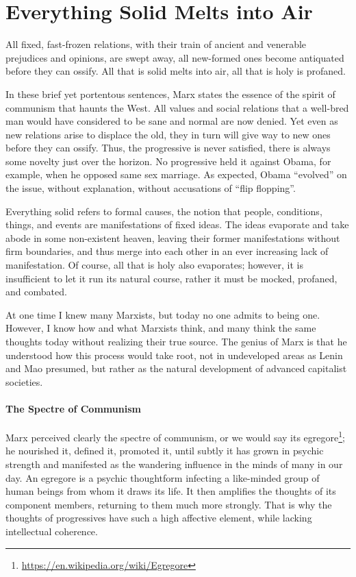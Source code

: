 \section{Everything Solid Melts into Air}

\begin{quotex}
All fixed, fast-frozen relations, with their train of ancient and venerable prejudices and opinions, are swept away, all new-formed ones become antiquated before they can ossify. All that is solid melts into air, all that is holy is profaned.
\end{quotex}


In these brief yet portentous sentences, Marx states the essence of the spirit of communism that haunts the West. All values and social relations that a well-bred man would have considered to be sane and normal are now denied. Yet even as new relations arise to displace the old, they in turn will give way to new ones before they can ossify. Thus, the progressive is never satisfied, there is always some novelty just over the horizon. No progressive held it against Obama, for example, when he opposed same sex marriage. As expected, Obama ``evolved'' on the issue, without explanation, without accusations of ``flip flopping''.

Everything solid refers to formal causes, the notion that people, conditions, things, and events are manifestations of fixed ideas. The ideas evaporate and take abode in some non-existent heaven, leaving their former manifestations without firm boundaries, and thus merge into each other in an ever increasing lack of manifestation. Of course, all that is holy also evaporates; however, it is insufficient to let it run its natural course, rather it must be mocked, profaned, and combated.

At one time I knew many Marxists, but today no one admits to being one. However, I know how and what Marxists think, and many think the same thoughts today without realizing their true source. The genius of Marx is that he understood how this process would take root, not in undeveloped areas as Lenin and Mao presumed, but rather as the natural development of advanced capitalist societies.

\paragraph{The Spectre of Communism}


Marx perceived clearly the spectre of communism, or we would say its egregore\footnote{\url{https://en.wikipedia.org/wiki/Egregore}}; he nourished it, defined it, promoted it, until subtly it has grown in psychic strength and manifested as the wandering influence in the minds of many in our day. An egregore is a psychic thoughtform infecting a like-minded group of human beings from whom it draws its life. It then amplifies the thoughts of its component members, returning to them much more strongly. That is why the thoughts of progressives have such a high affective element, while lacking intellectual coherence.

